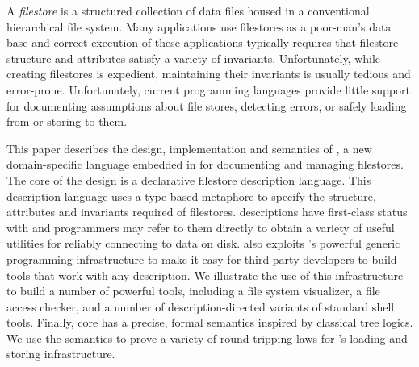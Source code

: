 A {\em filestore} is a structured collection of data files housed
in a conventional hierarchical file system.  Many applications
use filestores as a poor-man's data base and correct execution of 
these applications typically requires that filestore structure 
and attributes satisfy a variety of invariants.  Unfortunately, while
creating filestores is expedient, maintaining their invariants is 
usually tedious and error-prone.  Unfortunately, current programming 
languages provide little support for documenting assumptions about 
file stores, detecting errors, or safely loading from or storing to 
them.

This paper describes the design, implementation and semantics
of \forest{}, a new domain-specific language
embedded in \haskell{} for documenting and managing filestores.
The core of the \forest{} design is a declarative filestore
description language.  This description language uses a type-based
metaphore to specify the structure, attributes and invariants
required of filestores.  \forest{} descriptions
have first-class status with \haskell{} and programmers
may refer to them directly to obtain a variety of
useful utilities for reliably connecting to data on disk.
\forest{} also exploits \haskell{}'s powerful generic programming
infrastructure to make it easy for third-party developers to build
tools that work with any \forest{} description.  We illustrate the use
of this infrastructure to build a number of powerful tools, including a
file system
visualizer, a file access checker, and a
number of description-directed variants of
standard shell tools.  Finally, core \forest{} has a precise,
formal semantics inspired by classical tree logics.  We use the semantics
to prove a variety of round-tripping laws for \forest{}'s loading
and storing infrastructure.
